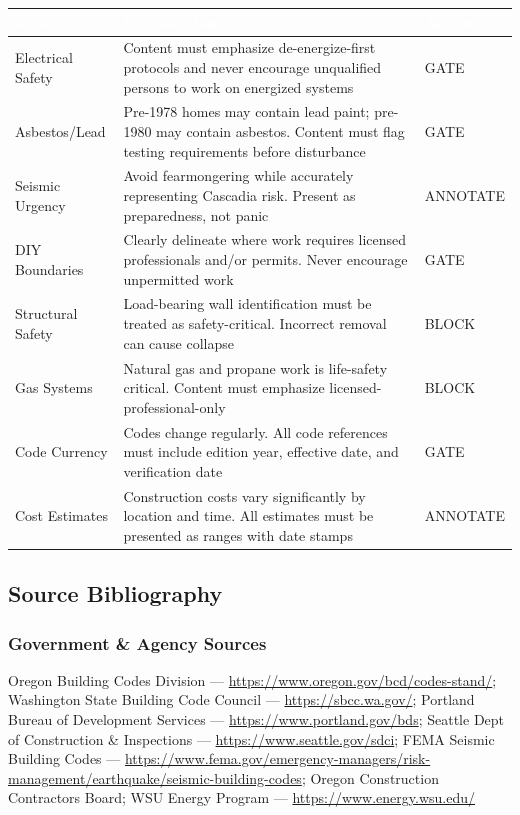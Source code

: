 \documentclass[11pt,letterpaper]{article}
\newcommand{\tableheader}[1]{\textbf{\sffamily\textcolor{white}{#1}}}
\begin{document}
\begin{center}
\begin{tabularx}{\textwidth}{L{3.5cm}XC{2cm}}
\toprule
{}
\tableheader{Area} & \tableheader{Consideration} & \tableheader{Action} \\
\midrule
Electrical Safety & Content must emphasize de-energize-first protocols and never encourage unqualified persons to work on energized systems & GATE \\
Asbestos/Lead & Pre-1978 homes may contain lead paint; pre-1980 may contain asbestos. Content must flag testing requirements before disturbance & GATE \\
Seismic Urgency & Avoid fearmongering while accurately representing Cascadia risk. Present as preparedness, not panic & ANNOTATE \\
DIY Boundaries & Clearly delineate where work requires licensed professionals and/or permits. Never encourage unpermitted work & GATE \\
Structural Safety & Load-bearing wall identification must be treated as safety-critical. Incorrect removal can cause collapse & BLOCK \\
Gas Systems & Natural gas and propane work is life-safety critical. Content must emphasize licensed-professional-only & BLOCK \\
Code Currency & Codes change regularly. All code references must include edition year, effective date, and verification date & GATE \\
Cost Estimates & Construction costs vary significantly by location and time. All estimates must be presented as ranges with date stamps & ANNOTATE \\
\bottomrule
\end{tabularx}
\end{center}

\subsection{Source Bibliography}

\subsubsection{Government \& Agency Sources}

Oregon Building Codes Division --- \url{https://www.oregon.gov/bcd/codes-stand/}; Washington State Building Code Council --- \url{https://sbcc.wa.gov/}; Portland Bureau of Development Services --- \url{https://www.portland.gov/bds}; Seattle Dept of Construction \& Inspections --- \url{https://www.seattle.gov/sdci}; FEMA Seismic Building Codes --- \url{https://www.fema.gov/emergency-managers/risk-management/earthquake/seismic-building-codes}; Oregon Construction Contractors Board; WSU Energy Program --- \url{https://www.energy.wsu.edu/}
\end{document}
